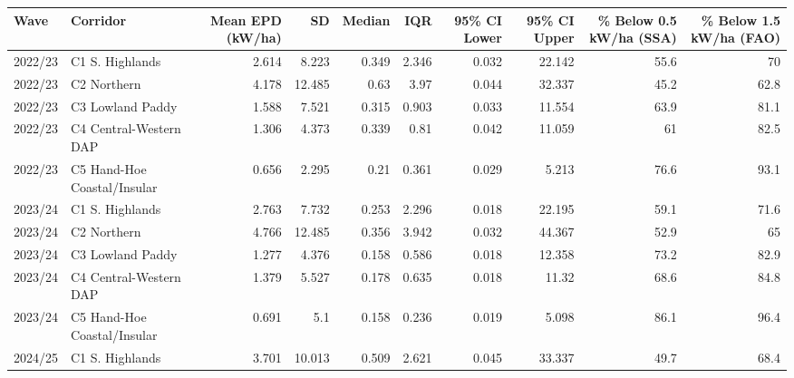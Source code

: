 \begin{tabular}{llrrrrrrrr}
\toprule
 Wave    & Corridor                    &   Mean EPD (kW/ha) &     SD &   Median &   IQR &   95\% CI Lower &   95\% CI Upper &   \% Below 0.5 kW/ha (SSA) &   \% Below 1.5 kW/ha (FAO) \\
\midrule
 2022/23 & C1 S. Highlands             &              2.614 &  8.223 &    0.349 & 2.346 &          0.032 &         22.142 &                      55.6 &                      70   \\
 2022/23 & C2 Northern                 &              4.178 & 12.485 &    0.63  & 3.97  &          0.044 &         32.337 &                      45.2 &                      62.8 \\
 2022/23 & C3 Lowland Paddy            &              1.588 &  7.521 &    0.315 & 0.903 &          0.033 &         11.554 &                      63.9 &                      81.1 \\
 2022/23 & C4 Central-Western DAP      &              1.306 &  4.373 &    0.339 & 0.81  &          0.042 &         11.059 &                      61   &                      82.5 \\
 2022/23 & C5 Hand-Hoe Coastal/Insular &              0.656 &  2.295 &    0.21  & 0.361 &          0.029 &          5.213 &                      76.6 &                      93.1 \\
 2023/24 & C1 S. Highlands             &              2.763 &  7.732 &    0.253 & 2.296 &          0.018 &         22.195 &                      59.1 &                      71.6 \\
 2023/24 & C2 Northern                 &              4.766 & 12.485 &    0.356 & 3.942 &          0.032 &         44.367 &                      52.9 &                      65   \\
 2023/24 & C3 Lowland Paddy            &              1.277 &  4.376 &    0.158 & 0.586 &          0.018 &         12.358 &                      73.2 &                      82.9 \\
 2023/24 & C4 Central-Western DAP      &              1.379 &  5.527 &    0.178 & 0.635 &          0.018 &         11.32  &                      68.6 &                      84.8 \\
 2023/24 & C5 Hand-Hoe Coastal/Insular &              0.691 &  5.1   &    0.158 & 0.236 &          0.019 &          5.098 &                      86.1 &                      96.4 \\
 2024/25 & C1 S. Highlands             &              3.701 & 10.013 &    0.509 & 2.621 &          0.045 &         33.337 &                      49.7 &                      68.4 \\

\end{tabular}
